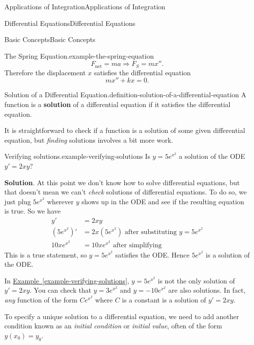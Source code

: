 \documentclass[10pt,]{book}
\newcommand{\terminology}[1]{\textbf{#1}}
\numberwithin{equation}{section}
\begin{document}
\begin{chapterptx}{Applications of Integration}{}{Applications of Integration}{}{}
\begin{sectionptx}{Differential Equations}{}{Differential Equations}{}{}
\begin{subsectionptx}{Basic Concepts}{}{Basic Concepts}{}{}
\begin{example}{The Spring Equation.}{example-the-spring-equation}
\begin{equation*}
F_{\text{net}} = ma \Rightarrow F_{S} = mx''.
\end{equation*}
Therefore the displacement \(x\) satisfies the differential equation%
\begin{equation*}
mx'' + kx = 0.
\end{equation*}
%
\end{example}
\begin{definition}{Solution of a Differential Equation.}{definition-solution-of-a-differential-equation}%
\hypertarget{p-722}{}%
A function is a \terminology{solution} of a differential equation if it satisfies the differential equation.%
\end{definition}
\hypertarget{p-723}{}%
It is straightforward to check if a function is a solution of some given differential equation, but \emph{finding} solutions involves a bit more work.%
\begin{example}{Verifying solutions.}{example-verifying-solutions}%
\hypertarget{p-724}{}%
Is \(y = 5e^{x^{2}}\) a solution of the ODE \(y' = 2xy\)?%
\par\smallskip%
\noindent\textbf{Solution}.\hypertarget{solution-153}{}\quad%
\hypertarget{p-725}{}%
At this point we don't know how to solve differential equations, but that doesn't mean we can't \emph{check} solutions of differential equations. To do so, we just plug \(5e^{x^{2}}\) wherever \(y\) shows up in the ODE and see if the resulting equation is true. So we have%
\begin{align*}
y' & = 2xy \\
(5e^{x^{2}})' & = 2x(5e^{x^{2}}) \text{ after substituting }y = 5e^{x^{2}}\\
10xe^{x^{2}} & = 10xe^{x^{2}} \text{ after simplifying} 
\end{align*}
This is a true statement, so \(y = 5e^{x^{2}}\) satisfies the ODE. Hence \(5e^{x^{2}}\) is a solution of the ODE.%
\end{example}
\hypertarget{p-726}{}%
In \hyperref[example-verifying-solutions]{Example~\ref{example-verifying-solutions}}, \(y = 5e^{x^{2}}\) is not the only solution of \(y' = 2xy\). You can check that \(y = 3e^{x^{2}}\) and \(y = -10e^{x^{2}}\) are also solutions. In fact, \emph{any} function of the form \(Ce^{x^{2}}\) where \(C\) is a constant is a solution of \(y' = 2xy\).%
\par
\hypertarget{p-727}{}%
To specify a unique solution to a differential equation, we need to add another condition known as an \emph{initial condition} or \emph{initial value}, often of the form \(y(x_{0}) = y_{0}\).%

\end{subsectionptx}
\end{sectionptx}
\end{chapterptx}
\end{document}
